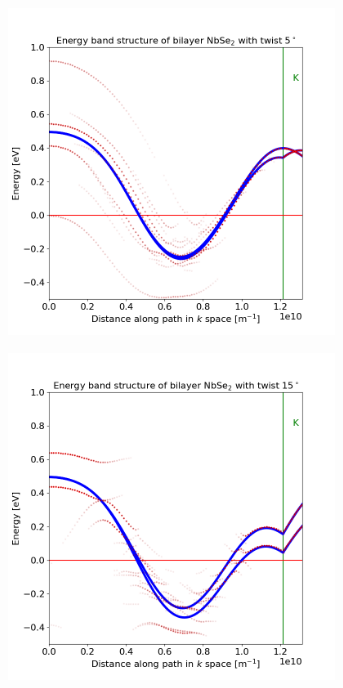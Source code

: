 \documentclass[12pt]{report} %
\begin{document}
\begin{figure}[t!]
\centering
  \begin{subfigure}[t]{0.45\textwidth}
    \centering
    \includegraphics[width=0.95\textwidth]{bilayer_bands_5_projected_low_E_saddle.png}
    \caption{
    }
    \label{bilayer_bands_5_projected_low_E_saddle}
  \end{subfigure}
  \hfill
  \begin{subfigure}[t]{0.45\textwidth}
    \centering
    \includegraphics[width=0.95\textwidth]{bilayer_bands_15_projected_low_E_saddle.png}
    \caption{
    }
    \label{bilayer_bands_15_projected_low_E_saddle}
  \end{subfigure}
  \caption{}
  \label{bilayer_bands_projected_low_E_saddle}
\end{figure}
\end{document}
